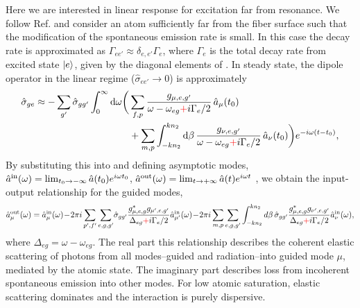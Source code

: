 \documentclass[preprint,aps,pra,onecolumn]{revtex4-1} %
\newcommand{\inp}{{\rm in}}
\newcommand{\out}{{\rm out}}
\newcommand{\comment}[1]{{\color{Maroon} #1}}
\newcommand{\error}[1]{{\color{red} #1}}
\begin{document}
Here we are interested in linear response for excitation far from resonance.  We follow Ref. \cite{le_kien_propagation_2014} and consider an atom sufficiently far from the fiber surface such that the modification of the spontaneous emission rate is small.   In this case the decay rate is approximated as $\Gamma_{ee'} \approx \delta_{e,e'} \Gamma_{e}$, where $\Gamma_e$ is the total decay rate from excited state $\lvert{e}\rangle$, given by the diagonal elements of .  In steady state, the dipole operator in the linear regime ($\hat{\sigma}_{ee'} \rightarrow 0 $) is approximately
	\begin{align}
		\hat{\sigma}_{ge} \approx -\sum_{g'} \hat{\sigma}_{gg'}\int_0^{\infty}\mathrm{d}\omega \bigg( & \sum_{f,p}  
\frac{g_{\mu, e,g'}}{\omega-\omega_{eg} \error{+} i \Gamma_{e}/2  }\, \hat{a}_\mu (t_0) \\
	&+\sum_{m,p} \int_{-kn_2}^{kn_2}\mathrm{d}\beta \, \frac{g_{\nu, e,g'}}{\omega-\omega_{eg} \error{+} i \Gamma_{e}/2 } \,\hat{a}_\nu (t_0)  \bigg)e^{-i\omega (t-t_0)} , \nn
	\end{align}
By substituting this into  and defining asymptotic modes, \comment{ $\hat{a}^{\inp}(\omega) = \lim_{t_0\rightarrow -\infty} \hat{a}(t_0) e^{i\omega t_0}$, $\hat{a}^{\out}(\omega) = \lim_{t\rightarrow +\infty} \hat{a}(t) e^{i\omega t}$ \cite{fan_input-output_2010}}, we obtain the input-output relationship for the guided modes,
	\begin{equation} \label{Eq::aout}
		\hat{a}^{\out}_\mu (\omega) = \hat{a}^{\inp}_\mu (\omega) \!-\! 2\pi i\sum_{p',f'} 
\sum_{e,g,g'}\!\hat{\sigma}_{gg'}\frac{ g_{\mu,e,g}^* g_{\mu',e,g'}}{ \Delta_{eg} \error{+} i \Gamma_{e}/2 }\hat{a}^{\inp}_{\mu'}(\omega) \!-\! 2\pi i\sum_{m,p} \sum_{e,g,g'} \int^{kn_2}_{-kn_2} d\beta \,\hat{\sigma}_{gg'}\frac{ g_{\mu,e,g}^* g_{\nu',e,g'}}{ \Delta_{eg} \error{+} i \Gamma_{e}/2 }\hat{a}^{\inp}_{\nu}(\omega),
	\end{equation}
where $\Delta_{eg} = \omega - \omega_{eg}$.  The real part this relationship describes the coherent elastic scattering of photons from all modes--guided and radiation--into guided mode $\mu$, mediated by the atomic state.  The imaginary part describes loss from incoherent spontaneous emission into other modes.  For low atomic saturation, elastic scattering dominates and the interaction is purely dispersive. 
\end{document}
